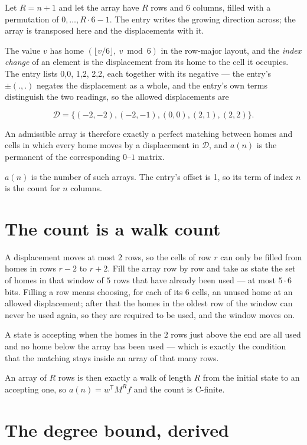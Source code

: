 \documentclass[11pt]{article}
\theoremstyle{definition}
\begin{document}
Let $R = n + 1$ and let the array have $R$ rows and $6$ columns, filled with a permutation of $0,\dots,R\cdot6-1$. The entry writes the growing direction across; the array is transposed here and the displacements with it.

The value $v$ has home $(\lfloor v/6\rfloor,\ v \bmod 6)$ in the row-major layout, and the {\itshape index change} of an element is the displacement from its home to the cell it occupies. The entry lists 0,0, 1,2, 2,2, each together with its negative --- the entry's $\pm(.,.)$ negates the displacement as a whole, and the entry's own terms distinguish the two readings, so the allowed displacements are

\[\mathcal{D} = \{(-2,-2), (-2,-1), (0,0), (2,1), (2,2)\}.\]

An admissible array is therefore exactly a perfect matching between homes and cells in which every home moves by a displacement in $\mathcal{D}$, and $a(n)$ is the permanent of the corresponding $0$--$1$ matrix.

$a(n)$ is the number of such arrays. The entry's offset is 1, so its term of index $n$ is the count for $n$ columns.

\section{The count is a walk count}

A displacement moves at most $2$ rows, so the cells of row $r$ can only be filled from homes in rows $r-2$ to $r+2$. Fill the array row by row and take as state the set of homes in that window of $5$ rows that have already been used --- at most $5\cdot6$ bits. Filling a row means choosing, for each of its $6$ cells, an unused home at an allowed displacement; after that the homes in the oldest row of the window can never be used again, so they are required to be used, and the window moves on.

A state is accepting when the homes in the $2$ rows just above the end are all used and no home below the array has been used --- which is exactly the condition that the matching stays inside an array of that many rows.

An array of $R$ rows is then exactly a walk of length $R$ from the initial state to an accepting one, so $a(n) = w^{\mathsf T}M^{R}f$ and the count is C-finite.

\section{The degree bound, derived}
\end{document}
